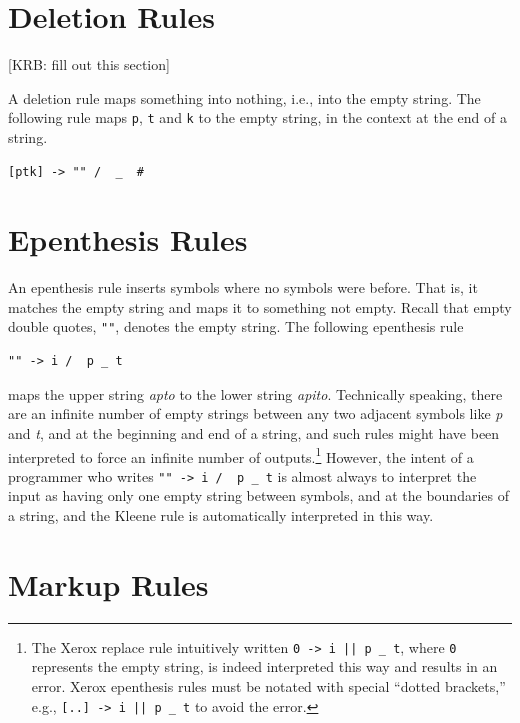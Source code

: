 \section{Deletion Rules}

[KRB:  fill out this section]

A deletion rule maps something into nothing, i.e., into the empty string.  The
following rule maps \texttt{p}, \texttt{t} and \texttt{k} to the empty string, in
the context at the end of a string.


\begin{Verbatim}
[ptk] -> "" /  _  #
\end{Verbatim}


\section{Epenthesis Rules}

An epenthesis rule inserts symbols where no symbols were before.  That is, it matches the empty string and maps it to
something not empty.  Recall that empty double quotes, \verb!""!, denotes the empty string.  The following epenthesis rule

\begin{Verbatim}
"" -> i /  p _ t
\end{Verbatim}

\noindent
maps the upper string \emph{apto} to the lower string \emph{apito}.  Technically speaking, there are an infinite number
of empty strings between any two adjacent symbols like \emph{p} and \emph{t}, and at the beginning and end of a string, and such rules might have been interpreted to force
an infinite number of outputs.\footnote{The Xerox replace rule intuitively
	written \verb!0 -> i || p _ t!, where \verb!0! represents the empty
	string, is indeed interpreted this
way and results in an error.  Xerox epenthesis rules must be notated with special ``dotted brackets,'' 
e.g., \verb![..] -> i || p _ t! to avoid the error.}  However, the intent of a programmer who writes \verb!"" -> i /  p _ t! is almost always to
interpret the input as having only one empty string between symbols, and at the boundaries of a string, and the Kleene rule is automatically interpreted in this way.


\section{Markup Rules}

\label{markupRules}

